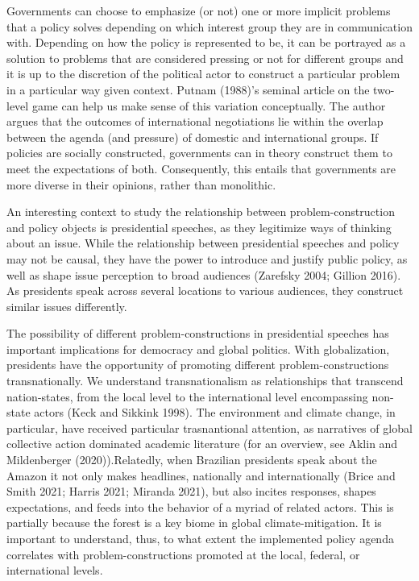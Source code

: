 \documentclass[
  12pt,
]{article}
\begin{document}
Governments can choose to emphasize (or not) one or more implicit
problems that a policy solves depending on which interest group they are
in communication with. Depending on how the policy is represented to be,
it can be portrayed as a solution to problems that are considered
pressing or not for different groups and it is up to the discretion of
the political actor to construct a particular problem in a particular
way given context. Putnam (1988)'s seminal article on the two-level game
can help us make sense of this variation conceptually. The author argues
that the outcomes of international negotiations lie within the overlap
between the agenda (and pressure) of domestic and international groups.
If policies are socially constructed, governments can in theory
construct them to meet the expectations of both. Consequently, this
entails that governments are more diverse in their opinions, rather than
monolithic.

An interesting context to study the relationship between
problem-construction and policy objects is presidential speeches, as
they legitimize ways of thinking about an issue. While the relationship
between presidential speeches and policy may not be causal, they have
the power to introduce and justify public policy, as well as shape issue
perception to broad audiences (Zarefsky 2004; Gillion 2016). As
presidents speak across several locations to various audiences, they
construct similar issues differently.

The possibility of different problem-constructions in presidential
speeches has important implications for democracy and global politics.
With globalization, presidents have the opportunity of promoting
different problem-constructions transnationally. We understand
transnationalism as relationships that transcend nation-states, from the
local level to the international level encompassing non-state actors
(Keck and Sikkink 1998). The environment and climate change, in
particular, have received particular trasnantional attention, as
narratives of global collective action dominated academic literature
(for an overview, see Aklin and Mildenberger (2020)).Relatedly, when
Brazilian presidents speak about the Amazon it not only makes headlines,
nationally and internationally (Brice and Smith 2021; Harris 2021;
Miranda 2021), but also incites responses, shapes expectations, and
feeds into the behavior of a myriad of related actors. This is partially
because the forest is a key biome in global climate-mitigation. It is
important to understand, thus, to what extent the implemented policy
agenda correlates with problem-constructions promoted at the local,
federal, or international levels.
\end{document}

